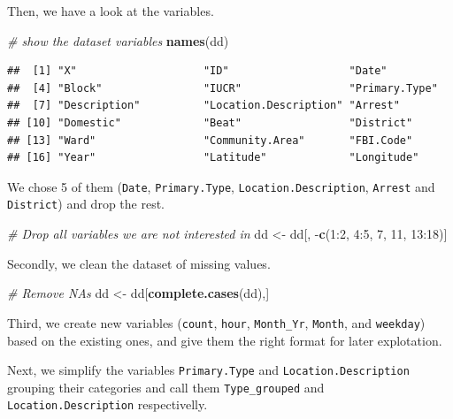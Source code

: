 \documentclass[]{article}
\newenvironment{Shaded}{\begin{snugshade}}{\end{snugshade}}
\newcommand{\KeywordTok}[1]{\textcolor[rgb]{0.13,0.29,0.53}{\textbf{{#1}}}}
\newcommand{\DecValTok}[1]{\textcolor[rgb]{0.00,0.00,0.81}{{#1}}}
\newcommand{\StringTok}[1]{\textcolor[rgb]{0.31,0.60,0.02}{{#1}}}
\newcommand{\CommentTok}[1]{\textcolor[rgb]{0.56,0.35,0.01}{\textit{{#1}}}}
\newcommand{\NormalTok}[1]{{#1}}
\begin{document}
Then, we have a look at the variables.

\begin{Shaded}
\begin{Highlighting}[]
\CommentTok{# show the dataset variables }
\KeywordTok{names}\NormalTok{(dd)}
\end{Highlighting}
\end{Shaded}

\begin{verbatim}
##  [1] "X"                    "ID"                   "Date"                
##  [4] "Block"                "IUCR"                 "Primary.Type"        
##  [7] "Description"          "Location.Description" "Arrest"              
## [10] "Domestic"             "Beat"                 "District"            
## [13] "Ward"                 "Community.Area"       "FBI.Code"            
## [16] "Year"                 "Latitude"             "Longitude"
\end{verbatim}

We chose 5 of them (\texttt{Date}, \texttt{Primary.Type},
\texttt{Location.Description}, \texttt{Arrest} and \texttt{District})
and drop the rest.

\begin{Shaded}
\begin{Highlighting}[]
\CommentTok{# Drop all variables we are not interested in}
\NormalTok{dd <-}\StringTok{ }\NormalTok{dd[, -}\KeywordTok{c}\NormalTok{(}\DecValTok{1}\NormalTok{:}\DecValTok{2}\NormalTok{, }\DecValTok{4}\NormalTok{:}\DecValTok{5}\NormalTok{, }\DecValTok{7}\NormalTok{, }\DecValTok{11}\NormalTok{, }\DecValTok{13}\NormalTok{:}\DecValTok{18}\NormalTok{)]}
\end{Highlighting}
\end{Shaded}

Secondly, we clean the dataset of missing values.

\begin{Shaded}
\begin{Highlighting}[]
\CommentTok{# Remove NAs}
\NormalTok{dd <-}\StringTok{ }\NormalTok{dd[}\KeywordTok{complete.cases}\NormalTok{(dd),]}
\end{Highlighting}
\end{Shaded}

Third, we create new variables (\texttt{count}, \texttt{hour},
\texttt{Month\_Yr}, \texttt{Month}, and \texttt{weekday}) based on the
existing ones, and give them the right format for later explotation.

Next, we simplify the variables \texttt{Primary.Type} and
\texttt{Location.Description} grouping their categories and call them
\texttt{Type\_grouped} and \texttt{Location.Description} respectivelly.
\end{document}
